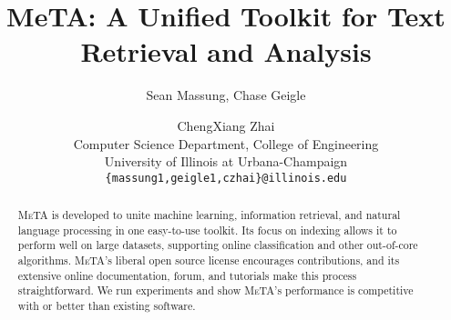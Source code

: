 \documentclass[11pt]{article}
\title{MeTA: A Unified Toolkit for Text Retrieval and Analysis}
\author{Sean Massung, Chase Geigle \and ChengXiang Zhai \\
            Computer Science Department, College of Engineering \\
            University of Illinois at Urbana-Champaign \\
            {\tt \{massung1,geigle1,czhai\}@illinois.edu}
}
\date{}
\def\meta/{\textsc{MeTA}}
\begin{document}
\maketitle

\begin{abstract}
\meta/ is developed to unite machine learning, information retrieval, and
natural language processing in one easy-to-use toolkit. Its focus on
indexing allows it to perform well on large datasets, supporting online
classification and other out-of-core algorithms. \meta/'s liberal open
source license encourages contributions, and its extensive online
documentation, forum, and tutorials make this process straightforward. We
run experiments and show \meta/'s performance is competitive with or better
than existing software.
\end{abstract}






\small


\normalsize
\end{document}
